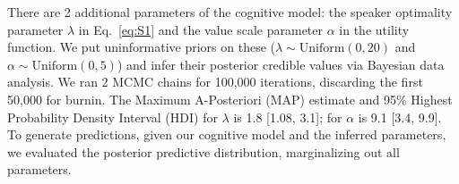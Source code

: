 \documentclass[10pt,letterpaper]{article}
\newcommand{\red}[1]{\textcolor{Red}{#1}}
\newcommand{\ndg}[1]{\textcolor{Green}{[ndg: #1]}}
\begin{document}




There are 2 additional parameters of the cognitive model: the speaker optimality parameter $\lambda$ in Eq.~\ref{eq:S1} and the value scale parameter $\alpha$ in the utility function.
We put uninformative priors on these ($\lambda \sim \text{Uniform}(0,20)$ and $\alpha \sim \text{Uniform}(0, 5)$) and infer their posterior credible values via Bayesian data analysis.
We ran 2 MCMC chains for 100,000 iterations, discarding the first 50,000 for burnin.
The Maximum A-Posteriori (MAP) estimate and 95\% Highest Probability Density Interval (HDI) for $\lambda$ is 1.8 [1.08, 3.1]; for $\alpha$ is 9.1 [3.4, 9.9]. %
To generate predictions, given our cognitive model and the inferred parameters, we evaluated the posterior predictive distribution, marginalizing out all parameters.
\end{document}
